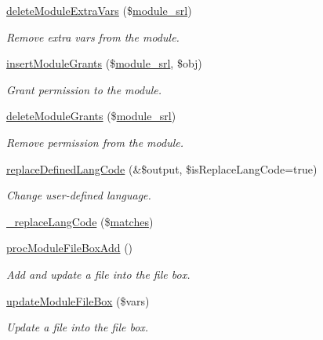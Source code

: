\begin{DoxyCompactItemize}
\hyperlink{classmoduleController_aff9b45ce153dcad735896f56fe60516f}{delete\+Module\+Extra\+Vars} (\$\hyperlink{ko_8install_8php_a370bb6450fab1da3e0ed9f484a38b761}{module\+\_\+srl})
\begin{DoxyCompactList}\small\item\em Remove extra vars from the module. \end{DoxyCompactList}\item 
\hyperlink{classmoduleController_a551eda7765398673c806ca1def44c7ac}{insert\+Module\+Grants} (\$\hyperlink{ko_8install_8php_a370bb6450fab1da3e0ed9f484a38b761}{module\+\_\+srl}, \$obj)
\begin{DoxyCompactList}\small\item\em Grant permission to the module. \end{DoxyCompactList}\item 
\hyperlink{classmoduleController_a34f1a44321986a8f4692be393d6a5c85}{delete\+Module\+Grants} (\$\hyperlink{ko_8install_8php_a370bb6450fab1da3e0ed9f484a38b761}{module\+\_\+srl})
\begin{DoxyCompactList}\small\item\em Remove permission from the module. \end{DoxyCompactList}\item 
\hyperlink{classmoduleController_ace764298e1aee4006ecd8dbf7aaf4007}{replace\+Defined\+Lang\+Code} (\&\$output, \$is\+Replace\+Lang\+Code=true)
\begin{DoxyCompactList}\small\item\em Change user-\/defined language. \end{DoxyCompactList}\item 
\hyperlink{classmoduleController_a0d4e5ad494cacf50288a3f6e9f013a5d}{\+\_\+replace\+Lang\+Code} (\$\hyperlink{jquery_8mobile_8customized_8min_8js_a0dd9fb10d0da7ad1a1c71aad2c6388f7}{matches})
\item 
\hyperlink{classmoduleController_a456022e1fca3a204b9b2b828b501fefb}{proc\+Module\+File\+Box\+Add} ()
\begin{DoxyCompactList}\small\item\em Add and update a file into the file box. \end{DoxyCompactList}\item 
\hyperlink{classmoduleController_af1ea81da50538369f648be26252ddd26}{update\+Module\+File\+Box} (\$vars)
\begin{DoxyCompactList}\small\item\em Update a file into the file box. \end{DoxyCompactList}\item 

\end{DoxyCompactItemize}

